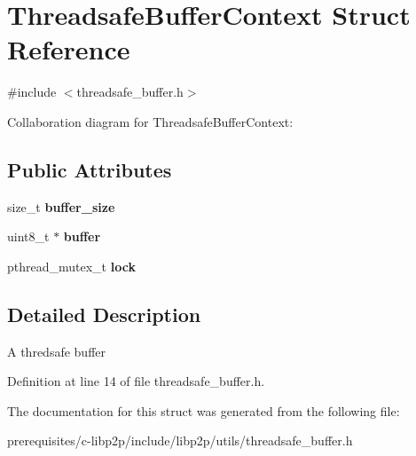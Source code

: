\hypertarget{struct_threadsafe_buffer_context}{}\section{Threadsafe\+Buffer\+Context Struct Reference}
\label{struct_threadsafe_buffer_context}


{\ttfamily \#include $<$threadsafe\+\_\+buffer.\+h$>$}



Collaboration diagram for Threadsafe\+Buffer\+Context\+:
\subsection*{Public Attributes}
\begin{DoxyCompactItemize}
\item 
\mbox{\label{struct_threadsafe_buffer_context_a6d2c9654edd3cb186eeb5d09095645d1}} 
size\+\_\+t {\bfseries buffer\+\_\+size}
\item 
\mbox{\label{struct_threadsafe_buffer_context_a7e59787eb251e04bae0d199a61b72c8d}} 
uint8\+\_\+t $\ast$ {\bfseries buffer}
\item 
\mbox{\label{struct_threadsafe_buffer_context_a9ec6142758fcb099cbc6bac63cf47e78}} 
pthread\+\_\+mutex\+\_\+t {\bfseries lock}
\end{DoxyCompactItemize}


\subsection{Detailed Description}
A thredsafe buffer 

Definition at line 14 of file threadsafe\+\_\+buffer.\+h.



The documentation for this struct was generated from the following file\+:\begin{DoxyCompactItemize}
\item 
prerequisites/c-\/libp2p/include/libp2p/utils/threadsafe\+\_\+buffer.\+h\end{DoxyCompactItemize}

